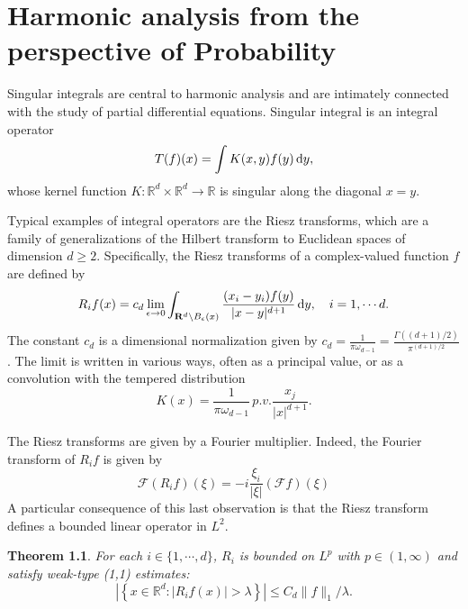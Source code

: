 \documentclass[twoside, 12pt]{book}
\numberwithin{equation}{chapter}
\newtheorem{theorem}{Theorem}[section]
\def\mR{{\mathbb R}}
\def\l{\left}
\def\r{\right}
\def\geq{\geqslant}
\def\leq{\leqslant}
\def\d{\text{\rm{d}}}
\begin{document}
    \chapter{Harmonic analysis from the perspective of Probability}
    
    Singular integrals are central to harmonic analysis and are intimately connected with the study of partial differential equations. Singular integral is an integral operator
	\[
	    T(f)(x)=\int K(x,y)f(y)\,\d y,
	\]
	whose kernel function $K: \mR^d\times\mR^d\to \mR$ is singular along the diagonal $x=y$. 
	
	Typical examples of integral operators are the Riesz transforms, which are a family of generalizations of the Hilbert transform to Euclidean spaces of dimension $d\geq 2$. Specifically, the Riesz transforms of a complex-valued function $f$ are defined by 
	\[
	    R_{i}f(x)=c_{d}\lim _{\epsilon \to 0}\int _{\mathbf {R}^{d}\backslash B_{\epsilon }(x)}{\frac {(x_{i}-y_{i})f(y)}{|x-y|^{d+1}}}\,\d y, \quad i=1,\cdots d. 
	\]
	The constant $c_d$ is a dimensional normalization given by $c_d={\frac {1}{\pi \omega _{d-1}}}=\frac {\Gamma((d+1)/2)}{\pi ^{(d+1)/2}}$. 
	The limit is written in various ways, often as a principal value, or as a convolution with the tempered distribution
	\[
	    K(x)={\frac {1}{\pi \omega _{d-1}}}\,p.v.{\frac {x_{j}}{|x|^{d+1}}}.
	\]
	
	The Riesz transforms are given by a Fourier multiplier. Indeed, the Fourier transform of $R_i f$ is given by 
	\[
	    \mathcal{F} (R_{i}f)(\xi)=-i \frac{\xi_{i}}{|\xi|} (\mathcal{F} f)(\xi)
	\] 
	A particular consequence of this last observation is that the Riesz transform defines a bounded linear operator in $L^2$.
	
	\begin{theorem}
	For each $i\in \{1,\cdots, d\}$, $R_i$ is bounded on $L^p$ with $p\in (1,\infty)$ and satisfy weak-type (1,1) estimates: 
		\begin{equation}
			\l| \l\{x\in \mR^d:  |R_i f(x)|>\lambda \r\}\r|\leq C_d \|f\|_1/\lambda. 
		\end{equation}\end{theorem}
	
\end{document}
